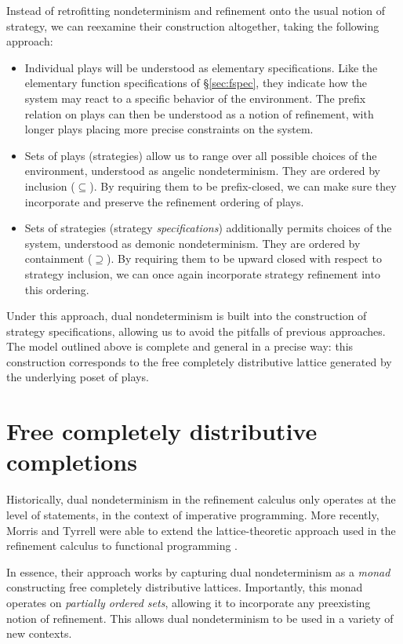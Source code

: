\documentclass[draft,11pt]{report}
\theoremstyle{definition}
\begin{document}
Instead of retrofitting nondeterminism and refinement
onto the usual notion of strategy,
we can reexamine their construction altogether,
taking the following approach:
\begin{itemize}
  \item Individual plays will be understood as
    elementary specifications.
    Like the elementary function specifications of \S\ref{sec:fspec},
    they indicate how the system may react
    to a specific behavior of the environment.
    The prefix relation on plays
    can then be understood as a notion of refinement,
    with longer plays placing more precise constraints
    on the system.
  \item Sets of plays (strategies)
    allow us to range over all possible choices of the environment,
    understood as angelic nondeterminism.
    They are ordered by inclusion ($\subseteq$).
    By requiring them to be prefix-closed,
    we can make sure they incorporate and preserve the refinement
    ordering of plays.
  \item Sets of strategies (strategy \emph{specifications})
    additionally permits choices of the system,
    understood as demonic nondeterminism.
    They are ordered by containment ($\supseteq$).
    By requiring them to be upward closed with respect to strategy inclusion,
    we can once again incorporate strategy refinement
    into this ordering.
\end{itemize}
Under this approach,
dual nondeterminism is built into
the construction of strategy specifications,
allowing us to avoid the pitfalls of previous approaches.
The model outlined above is complete and general
in a precise way:
this construction
corresponds to the free completely distributive lattice
generated by the underlying poset of plays.



\section{Free completely distributive completions} %

Historically,
dual nondeterminism in the refinement calculus
only operates at the level of statements,
in the context of imperative programming.
More recently,
Morris and Tyrrell were able to extend
the lattice-theoretic approach used in the refinement calculus
to functional programming
\citep{augtyp,dndf,cspdnd}.

In essence,
their approach works by
capturing dual nondeterminism as a \emph{monad}
constructing free completely distributive lattices.
Importantly,
this monad operates on \emph{partially ordered sets},
allowing it to incorporate
any preexisting notion of refinement.
This allows dual nondeterminism to be used
in a variety of new contexts.
\end{document}
